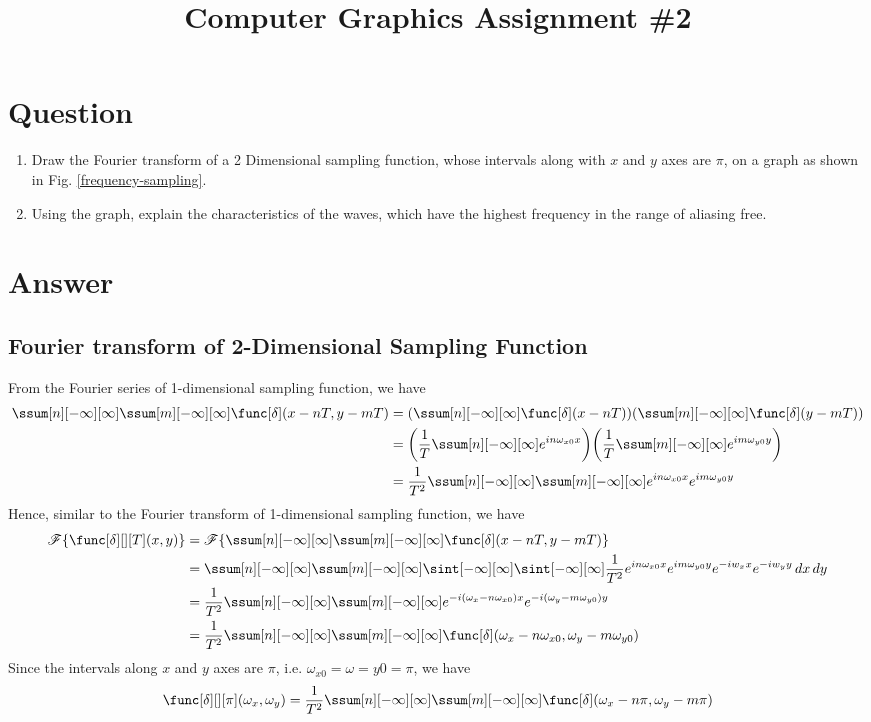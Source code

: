 

\usepackage{subfiles}
\usepackage{subcaption}
\usepackage{tikz}
\title{Computer Graphics Assignment \#2}

\section{Question}
\begin{enumerate}
    \item Draw the Fourier transform of a 2 Dimensional sampling function, whose intervals along with $x$ and $y$ axes are $\pi$, on a graph as shown in Fig. \ref{frequency-sampling}.
    \item Using the graph, explain the characteristics of the waves, which have the highest frequency in the range of aliasing free.
\end{enumerate}

\section{Answer}

\subsection{Fourier transform of 2-Dimensional Sampling Function}
From the Fourier series of 1-dimensional sampling function, we have
\begin{align}
\ssum[n][-\infty][\infty] \ssum[m][-\infty][\infty] \func[\delta](x-nT,y-mT)
&= \parens*{\ssum[n][-\infty][\infty] \func[\delta](x-nT)} \parens*{\ssum[m][-\infty][\infty] \func[\delta](y-mT)} \\
&= \parens*{\frac{1}{T}\ssum[n][-\infty][\infty] e^{in\omega_{x0}x}} \parens*{\frac{1}{T}\ssum[m][-\infty][\infty] e^{im\omega_{y0}y}} \\
&= \frac{1}{T^2} \ssum[n][-\infty][\infty] \ssum[m][-\infty][\infty] e^{in\omega_{x0}x} e^{im\omega_{y0}y}
\end{align}
Hence, similar to the Fourier transform of 1-dimensional sampling function, we have
\begin{align}
\fourier{\func[\delta][][T](x,y)}
&= \fourier{\ssum[n][-\infty][\infty] \ssum[m][-\infty][\infty] \func[\delta](x-nT,y-mT)} \\
&= \ssum[n][-\infty][\infty] \ssum[m][-\infty][\infty] \sint[-\infty][\infty] \sint[-\infty][\infty] \frac{1}{T^2} e^{in\omega_{x0}x} e^{im\omega_{y0}y} e^{-iw_x x} e^{-iw_y y} \dx \dy \\
&= \frac{1}{T^2} \ssum[n][-\infty][\infty] \ssum[m][-\infty][\infty] e^{-i(\omega_x - n\omega_{x0})x} e^{-i(\omega_y - m\omega_{y0})y} \\
&= \frac{1}{T^2} \ssum[n][-\infty][\infty] \ssum[m][-\infty][\infty] \func[\delta](\omega_x - n\omega_{x0},\omega_y - m\omega_{y0})
\end{align}
Since the intervals along $x$ and $y$ axes are $\pi$, i.e. $\omega_{x0} = \omega={y0} = \pi$, we have
\begin{equation}
\func[\delta][][\pi](\omega_x,\omega_y) = \frac{1}{T^2} \ssum[n][-\infty][\infty] \ssum[m][-\infty][\infty] \func[\delta](\omega_x - n\pi,\omega_y - m\pi) \label{solution}
\end{equation}

